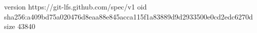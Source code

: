 version https://git-lfs.github.com/spec/v1
oid sha256:a409bd75a020476d8eaa88e845acca115f1a83889d9d2933500e0cd2edc6270d
size 43840
